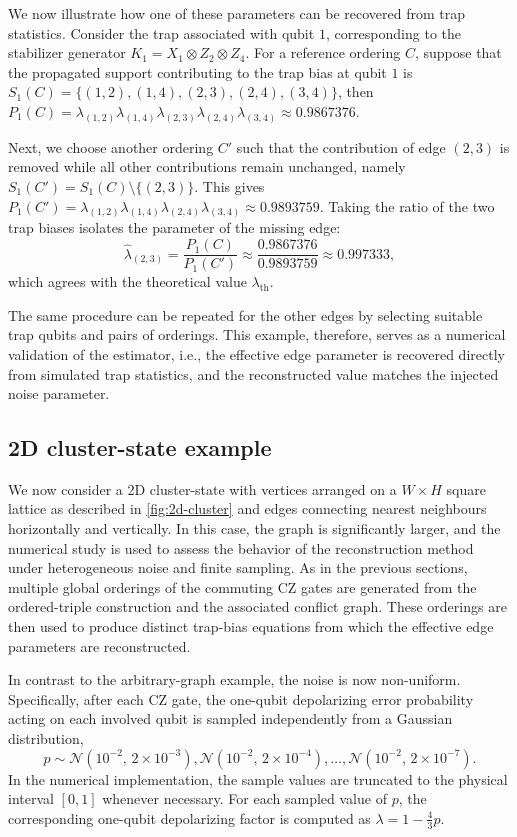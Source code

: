 We now illustrate how one of these parameters can be recovered from trap statistics. Consider the trap associated with qubit $1$, corresponding to the stabilizer generator $K_1=X_1\otimes Z_2\otimes Z_4$. For a reference ordering $C$, suppose that the propagated support contributing to the trap bias at qubit $1$ is $S_1(C)=\{(1,2),(1,4),(2,3),(2,4),(3,4)\}$, then $P_1(C)= \lambda_{(1,2)}\lambda_{(1,4)}\lambda_{(2,3)}\lambda_{(2,4)}\lambda_{(3,4)} \approx 0.9867376$.

Next, we choose another ordering $C'$ such that the contribution of edge $(2,3)$ is removed while all other contributions remain unchanged, namely $S_1(C')=S_1(C)\setminus\{(2,3)\}$. This gives
$P_1(C')=\lambda_{(1,2)}\lambda_{(1,4)}\lambda_{(2,4)}\lambda_{(3,4)}\approx 0.9893759$.
Taking the ratio of the two trap biases isolates the parameter of the missing edge:
\begin{equation}
	\widehat{\lambda}_{(2,3)}
	=
	\frac{P_1(C)}{P_1(C')}
	\approx
	\frac{0.9867376}{0.9893759}
	\approx 0.997333,
\end{equation}
which agrees with the theoretical value $\lambda_{\mathrm{th}}$.

The same procedure can be repeated for the other edges by selecting suitable trap qubits and pairs of orderings. This example, therefore, serves as a numerical validation of the estimator, i.e., the effective edge parameter is recovered directly from simulated trap statistics, and the reconstructed value matches the injected noise parameter.

\subsection{2D cluster-state example}

We now consider a 2D cluster-state with vertices arranged on a $W \times H$ square lattice as described in \cref{fig:2d-cluster} and edges connecting nearest neighbours horizontally and vertically. In this case, the graph is significantly larger, and the numerical study is used to assess the behavior of the reconstruction method under heterogeneous noise and finite sampling. As in the previous sections, multiple global orderings of the commuting $\mathrm{CZ}$ gates are generated from the ordered-triple construction and the associated conflict graph. These orderings are then used to produce distinct trap-bias equations from which the effective edge parameters are reconstructed.

In contrast to the arbitrary-graph example, the noise is now non-uniform. Specifically, after each $\mathrm{CZ}$ gate, the one-qubit depolarizing error probability acting on each involved qubit is sampled independently from a Gaussian distribution, 
\begin{equation}\label{equ:gaus}
p \sim \mathcal{N}\!\left(10^{-2},\,2\times 10^{-3}\right), \mathcal{N}\!\left(10^{-2},\,2\times 10^{-4}\right), \dots, \mathcal{N}\!\left(10^{-2},\,2\times 10^{-7}\right).
\end{equation}
In the numerical implementation, the sample values are truncated to the physical interval $[0,1]$ whenever necessary. For each sampled value of $p$, the corresponding one-qubit depolarizing factor is computed as $\lambda = 1-\frac{4}{3}p$.

